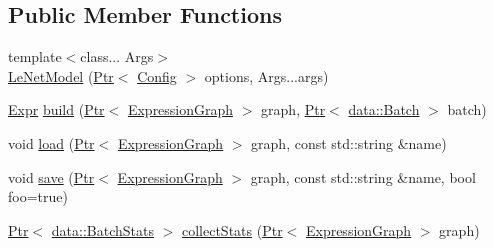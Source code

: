 \subsection*{Public Member Functions}
\begin{DoxyCompactItemize}
\item 
{\footnotesize template$<$class... Args$>$ }\\\hyperlink{classmarian_1_1models_1_1LeNetModel_aa916dc485b36cce6179878b02665509e}{Le\+Net\+Model} (\hyperlink{namespacemarian_ad1a373be43a00ef9ce35666145137b08}{Ptr}$<$ \hyperlink{classmarian_1_1Config}{Config} $>$ options, Args...\+args)
\item 
\hyperlink{namespacemarian_a498d8baf75b754011078b890b39c8e12}{Expr} \hyperlink{classmarian_1_1models_1_1LeNetModel_a3c8a71b2d5258f947e2745ab4acc706f}{build} (\hyperlink{namespacemarian_ad1a373be43a00ef9ce35666145137b08}{Ptr}$<$ \hyperlink{classmarian_1_1ExpressionGraph}{Expression\+Graph} $>$ graph, \hyperlink{namespacemarian_ad1a373be43a00ef9ce35666145137b08}{Ptr}$<$ \hyperlink{classmarian_1_1data_1_1Batch}{data\+::\+Batch} $>$ batch)
\item 
void \hyperlink{classmarian_1_1models_1_1LeNetModel_a9a3e1647c3306c40a61a9ba6dbae863d}{load} (\hyperlink{namespacemarian_ad1a373be43a00ef9ce35666145137b08}{Ptr}$<$ \hyperlink{classmarian_1_1ExpressionGraph}{Expression\+Graph} $>$ graph, const std\+::string \&name)
\item 
void \hyperlink{classmarian_1_1models_1_1LeNetModel_a1064b20c5914c5d0b0fe0987b9506db9}{save} (\hyperlink{namespacemarian_ad1a373be43a00ef9ce35666145137b08}{Ptr}$<$ \hyperlink{classmarian_1_1ExpressionGraph}{Expression\+Graph} $>$ graph, const std\+::string \&name, bool foo=true)
\item 
\hyperlink{namespacemarian_ad1a373be43a00ef9ce35666145137b08}{Ptr}$<$ \hyperlink{classmarian_1_1data_1_1BatchStats}{data\+::\+Batch\+Stats} $>$ \hyperlink{classmarian_1_1models_1_1LeNetModel_a091ea80b5538224897336326fa7f47ea}{collect\+Stats} (\hyperlink{namespacemarian_ad1a373be43a00ef9ce35666145137b08}{Ptr}$<$ \hyperlink{classmarian_1_1ExpressionGraph}{Expression\+Graph} $>$ graph)
\end{DoxyCompactItemize}
